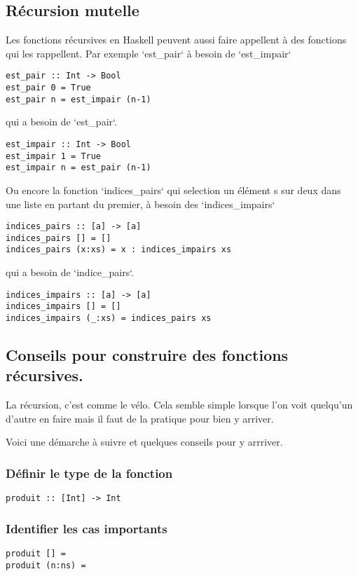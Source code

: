 \documentclass[11pt]{article}
\begin{document}
\subsection{Récursion mutelle}
\label{sec:org1f927db}
Les fonctions récursives en Haskell peuvent aussi faire appellent à des fonctions qui les rappellent.  Par exemple `est\_pair` à besoin de `est\_impair` 
\begin{verbatim}
est_pair :: Int -> Bool 
est_pair 0 = True
est_pair n = est_impair (n-1)
\end{verbatim}
qui a besoin de `est\_pair`.
\begin{verbatim}
est_impair :: Int -> Bool
est_impair 1 = True
est_impair n = est_pair (n-1)
\end{verbatim}
Ou encore la fonction `indices\_pairs` qui selection un élément s sur deux dans une liste en partant du premier, à besoin des `indices\_impairs`
\begin{verbatim}
indices_pairs :: [a] -> [a]
indices_pairs [] = []
indices_pairs (x:xs) = x : indices_impairs xs
\end{verbatim}

qui a besoin de `indice\_pairs`.
\begin{verbatim}
indices_impairs :: [a] -> [a]
indices_impairs [] = []
indices_impairs (_:xs) = indices_pairs xs
\end{verbatim}
\subsection{Conseils pour construire des fonctions récursives.}
\label{sec:orgedb593a}
La récursion,  c'est comme le vélo.  Cela semble simple lorsque l'on voit quelqu'un d'autre en faire mais il faut de la pratique pour bien y arriver.

Voici une démarche à suivre et quelques conseils pour y arrriver.
\subsubsection{Définir le type de la fonction}
\label{sec:org768e998}
\begin{verbatim}
produit :: [Int] -> Int
\end{verbatim}
\subsubsection{Identifier les cas importants}
\label{sec:org93affef}
\begin{verbatim}
produit [] = 
produit (n:ns) = 
\end{verbatim}
\end{document}
